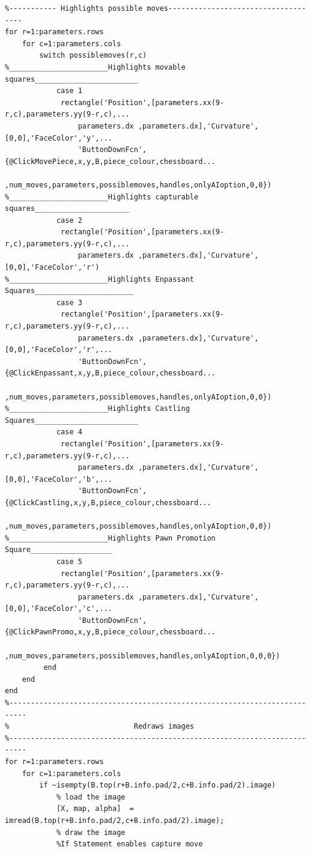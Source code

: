 \documentclass[11pt,a4paper]{article}
\begin{document}
\begin{lstlisting}
%----------- Highlights possible moves------------------------------------
for r=1:parameters.rows
    for c=1:parameters.cols
        switch possiblemoves(r,c)
%_______________________Highlights movable squares________________________
            case 1
             rectangle('Position',[parameters.xx(9-r,c),parameters.yy(9-r,c),...
                 parameters.dx ,parameters.dx],'Curvature',[0,0],'FaceColor','y',...
                 'ButtonDownFcn',{@ClickMovePiece,x,y,B,piece_colour,chessboard...
                 ,num_moves,parameters,possiblemoves,handles,onlyAIoption,0,0})
%_______________________Highlights capturable squares______________________
            case 2
             rectangle('Position',[parameters.xx(9-r,c),parameters.yy(9-r,c),...
                 parameters.dx ,parameters.dx],'Curvature',[0,0],'FaceColor','r')
%_______________________Highlights Enpassant Squares_______________________
            case 3
             rectangle('Position',[parameters.xx(9-r,c),parameters.yy(9-r,c),...
                 parameters.dx ,parameters.dx],'Curvature',[0,0],'FaceColor','r',...
                 'ButtonDownFcn',{@ClickEnpassant,x,y,B,piece_colour,chessboard...
                 ,num_moves,parameters,possiblemoves,handles,onlyAIoption,0,0})
%_______________________Highlights Castling Squares________________________
            case 4
             rectangle('Position',[parameters.xx(9-r,c),parameters.yy(9-r,c),...
                 parameters.dx ,parameters.dx],'Curvature',[0,0],'FaceColor','b',...
                 'ButtonDownFcn',{@ClickCastling,x,y,B,piece_colour,chessboard...
                 ,num_moves,parameters,possiblemoves,handles,onlyAIoption,0,0})
%_______________________Highlights Pawn Promotion Square___________________
            case 5
             rectangle('Position',[parameters.xx(9-r,c),parameters.yy(9-r,c),...
                 parameters.dx ,parameters.dx],'Curvature',[0,0],'FaceColor','c',...
                 'ButtonDownFcn',{@ClickPawnPromo,x,y,B,piece_colour,chessboard...
                 ,num_moves,parameters,possiblemoves,handles,onlyAIoption,0,0,0})
         end
    end
end
%--------------------------------------------------------------------------
%                             Redraws images 
%--------------------------------------------------------------------------
for r=1:parameters.rows
    for c=1:parameters.cols
        if ~isempty(B.top(r+B.info.pad/2,c+B.info.pad/2).image)
            % load the image
            [X, map, alpha]  = imread(B.top(r+B.info.pad/2,c+B.info.pad/2).image);
            % draw the image
            %If Statement enables capture move

\end{lstlisting}
\end{document}
